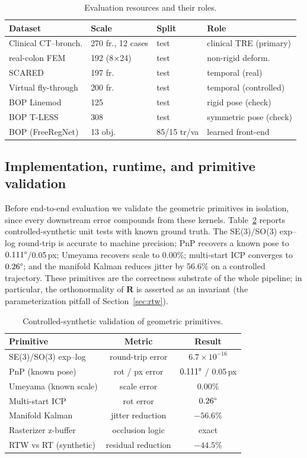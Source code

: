 \documentclass[9pt,twoside,web]{ieeecolor2}
\begin{document}
\begin{table}[t]
\centering
\caption{Evaluation resources and their roles.}
\label{tab:datasets}
\setlength{\tabcolsep}{4pt}\small
\begin{tabular}{llll}
\toprule
Dataset & Scale & Split & Role \\
\midrule
Clinical CT--bronch. & 270 fr., 12 cases & test & clinical TRE (primary) \\
real-colon FEM & 192 (8$\times$24) & test & non-rigid deform. \\
SCARED~\cite{allan2021scared} & 197 fr. & test & temporal (real) \\
Virtual fly-through & 200 fr. & test & temporal (controlled) \\
BOP Linemod~\cite{hodan2018bop} & 125 & test & rigid pose (check) \\
BOP T-LESS~\cite{hodan2018bop} & 308 & test & symmetric pose (check) \\
BOP (FreeRegNet) & 13 obj. & 85/15 tr/va & learned front-end \\
\bottomrule
\end{tabular}
\end{table}

\subsection{Implementation, runtime, and primitive validation}
Before end-to-end evaluation we validate the geometric primitives in isolation, since every downstream error compounds from these kernels. Table~\ref{tab:unit} reports controlled-synthetic unit tests with known ground truth. The SE(3)/SO(3) exp--log round-trip is accurate to machine precision; PnP recovers a known pose to $0.111\degree$/0.05\,px; Umeyama recovers scale to 0.00\%; multi-start ICP converges to $0.26\degree$; and the manifold Kalman reduces jitter by 56.6\% on a controlled trajectory. These primitives are the correctness substrate of the whole pipeline; in particular, the orthonormality of $\mathbf{R}$ is asserted as an invariant (the parameterization pitfall of Section~\ref{sec:rtw}).

\begin{table}[t]
\centering
\caption{Controlled-synthetic validation of geometric primitives.}
\label{tab:unit}
\setlength{\tabcolsep}{4pt}\small
\begin{tabular}{lcc}
\toprule
Primitive & Metric & Result \\
\midrule
SE(3)/SO(3) exp--log & round-trip error & $6.7\times10^{-16}$ \\
PnP (known pose) & rot / px error & $0.111\degree$ / 0.05\,px \\
Umeyama (known scale) & scale error & 0.00\% \\
Multi-start ICP & rot error & $0.26\degree$ \\
Manifold Kalman & jitter reduction & $-56.6\%$ \\
Rasterizer z-buffer & occlusion logic & exact \\
RTW vs RT (synthetic) & residual reduction & $-44.5\%$ \\
\bottomrule
\end{tabular}
\end{table}
\end{document}
